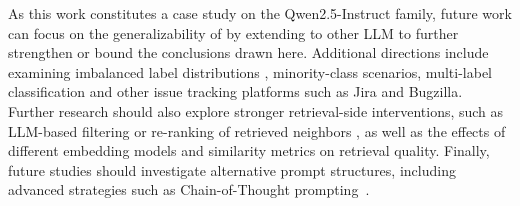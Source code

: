  As this work constitutes a case study on the Qwen2.5-Instruct family, future work can focus on the generalizability of  by extending  to other LLM  to further strengthen or bound the conclusions drawn here. Additional directions include examining imbalanced label distributions , minority-class scenarios, multi-label classification and other issue tracking platforms such as Jira and Bugzilla. Further research should also explore stronger retrieval-side interventions, such as LLM-based filtering or re-ranking of retrieved neighbors , as well as the effects of different embedding models and similarity metrics on retrieval quality. Finally, future studies should investigate alternative prompt structures, including advanced strategies such as Chain-of-Thought prompting~\cite{koyuncu2025exploring}.
